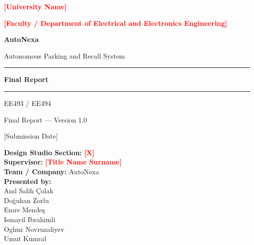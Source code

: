 \documentclass[12pt,a4paper]{report}
\newcommand{\pname}{AutoNexa}
\newcommand{\reportdate}{[Submission Date]}
\newcommand{\courseinfo}{EE493 / EE494}
\newcommand{\ver}{Final Report --- Version 1.0}
\newcommand{\TODO}[1]{\textcolor{red}{\textbf{[#1]}}}
\begin{document}
\begin{titlepage}
    \centering
    \vspace*{1.0cm}

    {\large \TODO{University Name} \par}
    \vspace{0.2cm}
    {\large \TODO{Faculty / Department of Electrical and Electronics Engineering} \par}

    \vspace{1.4cm}

    {\Huge \textbf{\textcolor{navyblue}{\pname}} \par}
    \vspace{0.4cm}
    {\LARGE Autonomous Parking and Recall System \par}
    \vspace{1.4cm}

    \noindent\rule{\textwidth}{1.5pt}
    \vspace{0.4cm}

    {\Huge \textbf{Final Report} \par}
    \vspace{0.4cm}
    \noindent\rule{\textwidth}{1.5pt}

    \vspace{1cm}
    {\Large \courseinfo \par}
    \vspace{0.3cm}
    {\large \ver \par}
    \vspace{0.3cm}
    {\large \reportdate \par}

    \vfill

    \begin{flushleft}
    \textbf{Design Studio Section:} \TODO{X} \\[0.3cm]
    \textbf{Supervisor:} \TODO{Title Name Surname} \\[0.3cm]
    \textbf{Team / Company:} AutoNexa \\[0.3cm]
    \textbf{Presented by:} \\[0.2cm]
    \quad An\i{}l Salih \c{C}olak \\
    \quad Do\u{g}ukan Zorlu \\
    \quad Emre Mende\c{s} \\
    \quad Ismayil Ibrahimli \\
    \quad Oghuz Novruzaliyev \\
    \quad Umut Kumral \\
    \end{flushleft}

    \vfill
\end{titlepage}
\end{document}
